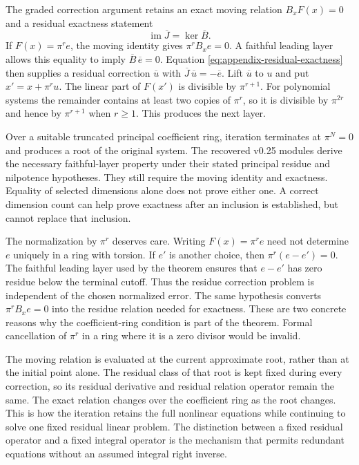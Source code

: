 The graded correction argument retains an exact moving relation
$B_xF(x)=0$ and a residual exactness statement
\begin{equation}
 \operatorname{im}\overline J=\ker\overline B.
 \label{eq:appendix-residual-exactness}
\end{equation}
If $F(x)=\pi^r e$, the moving identity gives $\pi^r B_xe=0$. A faithful
leading layer allows this equality to imply
$\overline B\,\overline e=0$. Equation
\eqref{eq:appendix-residual-exactness} then supplies a residual correction
$\overline u$ with $\overline J\,\overline u=-\overline e$. Lift
$\overline u$ to $u$ and put $x'=x+\pi^r u$. The linear part of $F(x')$
is divisible by $\pi^{r+1}$. For polynomial systems the remainder contains
at least two copies of $\pi^r$, so it is divisible by $\pi^{2r}$ and hence
by $\pi^{r+1}$ when $r\ge1$. This produces the next layer.

Over a suitable truncated principal coefficient ring, iteration terminates
at $\pi^N=0$ and produces a root of the original system. The recovered
v0.25 modules derive the necessary faithful-layer property under their
stated principal residue and nilpotence hypotheses. They still require
the moving identity and exactness. Equality of selected dimensions alone
does not prove either one. A correct dimension count can help prove
exactness after an inclusion is established, but cannot replace that
inclusion.

The normalization by $\pi^r$ deserves care. Writing
$F(x)=\pi^r e$ need not determine $e$ uniquely in a ring with torsion.
If $e'$ is another choice, then $\pi^r(e-e')=0$. The faithful leading
layer used by the theorem ensures that $e-e'$ has zero residue below the
terminal cutoff. Thus the residue correction problem is independent of
the chosen normalized error. The same hypothesis converts
$\pi^r B_xe=0$ into the residue relation needed for exactness. These are
two concrete reasons why the coefficient-ring condition is part of the
theorem. Formal cancellation of $\pi^r$ in a ring where it is a zero
divisor would be invalid.

The moving relation is evaluated at the current approximate root, rather
than at the initial point alone. The residual class of that root is kept
fixed during every correction, so its residual derivative and residual
relation operator remain the same. The exact relation changes over the
coefficient ring as the root changes. This is how the iteration retains
the full nonlinear equations while continuing to solve one fixed
residual linear problem. The distinction between a fixed residual
operator and a fixed integral operator is the mechanism that permits
redundant equations without an assumed integral right inverse.

